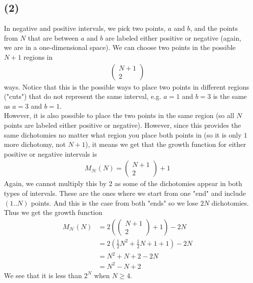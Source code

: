 \documentclass[a4paper]{article}
\begin{document}
\subsection*{(2)}
In negative and positive intervals, we pick two points, $a$ and $b$, and the points from $N$ that are between $a$ and $b$ are labeled either positive or negative (again, we are in a one-dimensional space). We can choose two points in the possible $N+1$ regions in
\begin{align*}
\begin{pmatrix}
N+1 \\
2
\end{pmatrix}
\end{align*}
ways. Notice that this is the possible ways to place two points in different regions ("cuts") that do not represent the same interval, e.g. $a=1$ and $b=3$ is the same as $a=3$ and $b=1$. \\
However, it is also possible to place the two points in the same region (so all $N$ points are labeled either positive or negative). However, since this provides the same dichotomies no matter what region you place both points in (so it is only $1$ more dichotomy, not $N+1$), it means we get that the growth function for either positive or negative intervals is
\begin{align*}
M_\mathcal{H}(N) =
\begin{pmatrix}
N+1 \\
2
\end{pmatrix}
+ 1
\end{align*}
Again, we cannot multiply this by $2$ as some of the dichotomies appear in both types of intervals. These are the ones where we start from one "end" and include $(1..N)$ points. And this is the case from both "ends" so we lose $2N$ dichotomies. Thus we get the growth function
\begin{align*}
M_\mathcal{H}(N) &=
2\left(
\begin{pmatrix}
N+1 \\
2
\end{pmatrix}
+ 1\right) - 2N \\
&= 2\left(\frac{1}{2}N^2+\frac{1}{2}N+1+1\right)-2N \\
&=N^2+N+2-2N \\
&=N^2-N+2
\end{align*}
We see that it is less than $2^N$ when $N\geq 4$.
\end{document}
